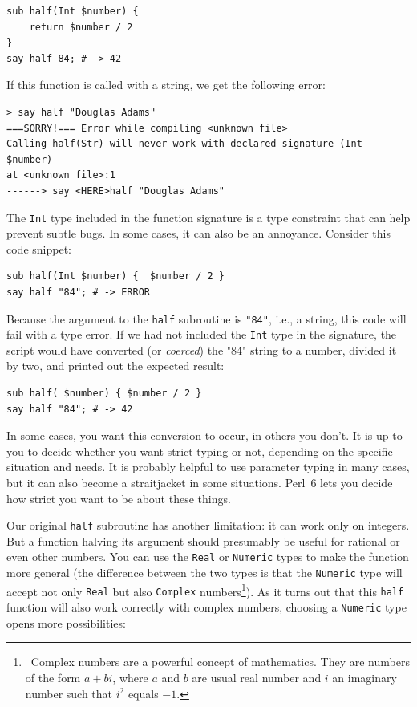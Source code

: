 \begin{verbatim}
sub half(Int $number) { 
    return $number / 2 
}
say half 84; # -> 42
\end{verbatim}

If this function is called with a string, we get the 
following error:

\begin{verbatim}
> say half "Douglas Adams"
===SORRY!=== Error while compiling <unknown file>
Calling half(Str) will never work with declared signature (Int $number)
at <unknown file>:1
------> say <HERE>half "Douglas Adams"
\end{verbatim}

The {\tt Int} type included in the function signature is a type 
constraint that can help prevent subtle bugs. In some cases, 
it can also be an annoyance. Consider this code snippet:


\begin{verbatim}
sub half(Int $number) {  $number / 2 }
say half "84"; # -> ERROR
\end{verbatim}

Because the argument to the {\tt half} subroutine is {\tt "84"}, 
i.e., a string, this code will fail with a type error. If we had 
not included the {\tt Int} type in the signature, the script 
would have converted (or \emph{coerced}) the "84" string to 
a number, divided it by two, and printed out the expected result:

\begin{verbatim}
sub half( $number) { $number / 2 }
say half "84"; # -> 42
\end{verbatim}

In some cases, you want this conversion to occur, in others 
you don't. It is up to you to decide whether you want 
strict typing or not, depending on the specific situation and
needs. It is probably helpful to use parameter typing in many 
cases, but it can also become a straitjacket in some situations. 
Perl~6 lets you decide how strict you want to be about these things.

Our original {\tt half} subroutine has another limitation: it
can work only on integers. But a function halving its argument 
should presumably be useful for rational or even other numbers. 
You can use the {\tt Real} or {\tt Numeric} types to make 
the function more general (the difference between the two 
types is that the {\tt Numeric} type will accept not only 
{\tt Real} but also {\tt Complex} numbers\footnote{~Complex 
numbers are a powerful concept of mathematics. They are numbers 
of the form $a + bi$, where $a$ and $b$ are usual real number and 
$i$ an imaginary number such that $i^2$ equals $-1$.}). As it turns out 
that this {\tt half} function will also work correctly 
with complex numbers, choosing a {\tt Numeric} 
type opens more possibilities:

